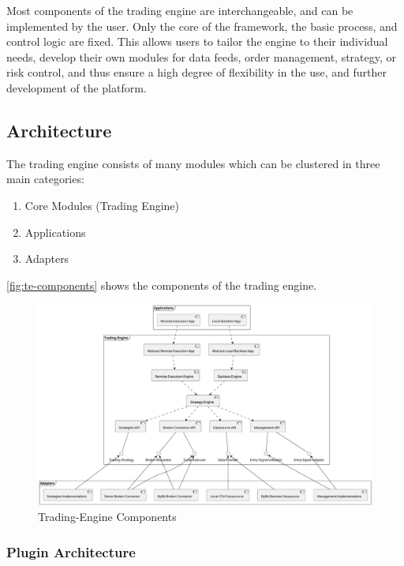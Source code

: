 \noindent
Most components of the trading engine are interchangeable, and can be implemented by the user.
Only the core of the framework, the basic process, and control logic are fixed.
This allows users to tailor the engine to their individual needs, develop their own modules for data feeds, order management, strategy, or risk control, and thus ensure a high degree of flexibility in the use, and further development of the platform.

\subsection{Architecture}

The trading engine consists of many modules which can be clustered in three main categories:

\begin{enumerate}
    \item Core Modules (Trading Engine)
    \item Applications
    \item Adapters
\end{enumerate}

\noindent
\autoref{fig:te-components} shows the components of the trading engine.

\begin{figure}[H]
    \centering
    \includegraphics[width=\textwidth]{images/trading-engine/trading-engine-components}
    \caption{Trading-Engine Components}
    \label{fig:te-components}
\end{figure}

\subsubsection{Plugin Architecture}

